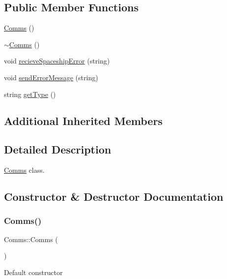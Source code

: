 \subsection*{Public Member Functions}
\begin{DoxyCompactItemize}
\item 
\hyperlink{classComms_aa3878221ed907d6d6841ee77741c1f49}{Comms} ()
\item 
\hyperlink{classComms_ad18d3a80a82d18d27b0de3b551e4f5fc}{$\sim$\+Comms} ()
\item 
void \hyperlink{classComms_a1aed1c01a813afd55309fdc59d2871bf}{recieve\+Spaceship\+Error} (string)
\item 
void \hyperlink{classComms_a23c37f6d10f06c7cfe25c4dc7d62fa12}{send\+Error\+Message} (string)
\item 
string \hyperlink{classComms_ae76ecf305b690220aa4fa68d0d798357}{get\+Type} ()
\end{DoxyCompactItemize}
\subsection*{Additional Inherited Members}


\subsection{Detailed Description}
\hyperlink{classComms}{Comms} class. 

\subsection{Constructor \& Destructor Documentation}
\mbox{\label{classComms_aa3878221ed907d6d6841ee77741c1f49}} 
\subsubsection{\texorpdfstring{Comms()}{Comms()}}
{\footnotesize\ttfamily Comms\+::\+Comms (\begin{DoxyParamCaption}{ }\end{DoxyParamCaption})\hspace{0.3cm}{\ttfamily [inline]}}

Default constructor \mbox{\label{classComms_ad18d3a80a82d18d27b0de3b551e4f5fc}} 
